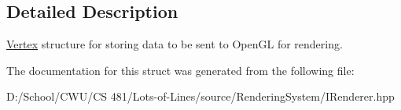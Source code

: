 \subsection{Detailed Description}
\hyperlink{struct_lots_of_lines_1_1_vertex}{Vertex} structure for storing data to be sent to Open\+GL for rendering. 

The documentation for this struct was generated from the following file\+:\begin{DoxyCompactItemize}
\item 
D\+:/\+School/\+C\+W\+U/\+C\+S 481/\+Lots-\/of-\/\+Lines/source/\+Rendering\+System/I\+Renderer.\+hpp\end{DoxyCompactItemize}
